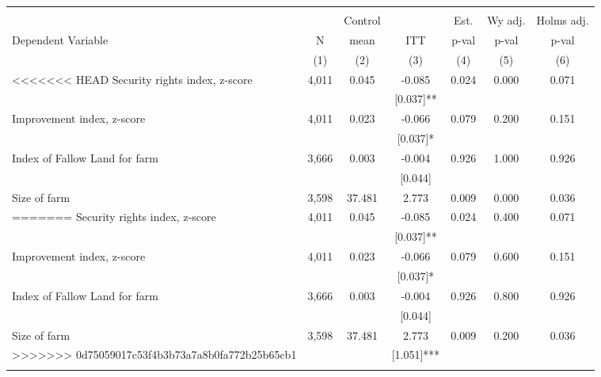 \begin{tabular}{lcccccc}
\hline \noalign{\smallskip} &  &  &  &  &  & \\
 &  & Control &  & Est. & Wy adj. & Holms adj.\\
Dependent Variable & N & mean & ITT & p-val & p-val & p-val\\
 & (1) & (2) & (3) & (4) & (5) & (6)\\
<<<<<<< HEAD
\noalign{\smallskip}\hline \noalign{\smallskip}Security rights index, z-score & 4,011 & 0.045 & -0.085 & 0.024 & 0.000 & 0.071\\
 &  &  & [0.037]** &  &  & \\
Improvement index, z-score & 4,011 & 0.023 & -0.066 & 0.079 & 0.200 & 0.151\\
 &  &  & [0.037]* &  &  & \\
Index of Fallow Land for farm & 3,666 & 0.003 & -0.004 & 0.926 & 1.000 & 0.926\\
 &  &  & [0.044] &  &  & \\
Size of farm & 3,598 & 37.481 & 2.773 & 0.009 & 0.000 & 0.036\\
=======
\noalign{\smallskip}\hline \noalign{\smallskip}Security rights index, z-score & 4,011 & 0.045 & -0.085 & 0.024 & 0.400 & 0.071\\
 &  &  & [0.037]** &  &  & \\
Improvement index, z-score & 4,011 & 0.023 & -0.066 & 0.079 & 0.600 & 0.151\\
 &  &  & [0.037]* &  &  & \\
Index of Fallow Land for farm & 3,666 & 0.003 & -0.004 & 0.926 & 0.800 & 0.926\\
 &  &  & [0.044] &  &  & \\
Size of farm & 3,598 & 37.481 & 2.773 & 0.009 & 0.200 & 0.036\\
>>>>>>> 0d75059017c53f4b3b73a7a8b0fa772b25b65cb1
 &  &  & [1.051]*** &  &  & \\
\noalign{\smallskip}\hline\end{tabular}
